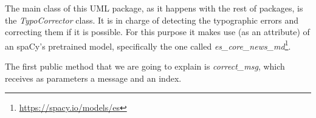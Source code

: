 The main class of this UML package, as it happens with the rest of packages, is the \textit{TypoCorrector} class. It is in charge of detecting the typographic errors and correcting them if it is possible. For this purpose it makes use (as an attribute) of an spaCy's pretrained model, specifically the one called \textit{es\_core\_news\_md}\footnote{\url{https://spacy.io/models/es}}.

The first public method that we are going to explain is \textit{correct\_msg}, which receives as parameters a message and an index.